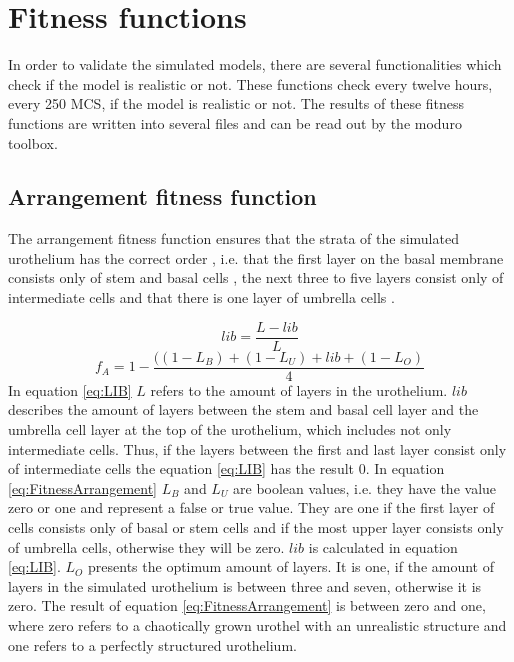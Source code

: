 \section{Fitness functions}\label{sec:fitnessFunctions}
In order to validate the simulated models, there are several functionalities which check if the model is realistic or not. These functions check every twelve hours, every 250 \ac{MCS}, if the model is realistic or not. The results of these fitness functions are written into several files and can be read out by the moduro toolbox.

\subsection{Arrangement fitness function} \label{subsec:ArrangementFitness}
The arrangement fitness function ensures that the strata of the simulated urothelium has the correct order \cite{Torelli2017}, i.e. that the first layer on the basal membrane consists only of stem and basal cells \cite{Yamany2014, Lazzeri2006}, the next three to five layers consist only of intermediate cells \cite{PuneetKhandelwal2009} and that there is one layer of umbrella cells \cite{PuneetKhandelwal2009, Yamany2014}.

\begin{equation}\label{eq:LIB}
lib = \dfrac{L - lib}{L}
\end{equation}
\begin{equation}\label{eq:FitnessArrangement} 
f_{A} = 1 - \dfrac{((1-L_{B})+(1-L_{U})+lib+(1-L_{O})}{4}
\end{equation}
In equation \ref{eq:LIB} $L$ refers to the amount of layers in the urothelium. $lib$ describes the amount of layers between the stem and basal cell layer and the umbrella cell layer at the top of the urothelium, which includes not only intermediate cells. Thus, if the layers between the first and last layer consist only of intermediate cells the equation \ref{eq:LIB} has the result 0.\newline
In equation \ref{eq:FitnessArrangement} $L_{B}$ and $L_{U}$ are boolean values, i.e. they have the value zero or one and represent a false or true value. They are one if the first layer of cells consists only of basal or stem cells and if the most upper layer consists only of umbrella cells, otherwise they will be zero.
$lib$ is calculated in equation \ref{eq:LIB}. $L_{O}$ presents the optimum amount of layers. It is one, if the amount of layers in the simulated urothelium is between three and seven, otherwise it is zero. The result of equation \ref{eq:FitnessArrangement} is between zero and one, where zero refers to a chaotically grown urothel with an unrealistic structure and one refers to a perfectly structured urothelium. \newline

